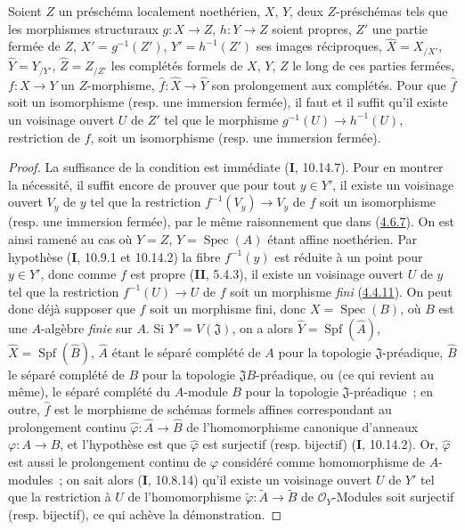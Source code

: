 \begin{proposition}[4.6.8]
\label{III.4.6.8-fr}
Soient $Z$ un préschéma localement noethérien, $X$, $Y$, deux $Z$-préschémas
tels que les morphismes structuraux $g:X\to Z$, $h:Y\to Z$ soient propres,
$Z'$ une partie fermée de $Z$, $X'=g^{-1}(Z')$, $Y'=h^{-1}(Z')$ ses images
réciproques,
$\widehat X=X_{/X'}$, $\widehat Y=Y_{/Y'}$, $\widehat Z=Z_{/Z'}$
les complétés formels de $X$, $Y$, $Z$ le long de ces parties fermées,
$f:X\to Y$ un $Z$-morphisme, $\widehat f:\widehat X\to\widehat Y$ son
prolongement aux complétés. Pour que $\widehat f$ soit un isomorphisme (\textup{resp.}
une immersion fermée), il faut et il suffit qu'il existe un voisinage ouvert
$U$ de $Z'$ tel que le morphisme $g^{-1}(U)\to h^{-1}(U)$, restriction de
$f$, soit un isomorphisme (\textup{resp.} une immersion fermée).
\end{proposition}

\begin{proof}
La suffisance de la condition est immédiate (\textbf{I}, 10.14.7). Pour en montrer la
nécessité, il suffit encore de prouver que pour tout $y\in Y'$, il existe un
voisinage ouvert $V_y$ de $y$ tel que la restriction
$f^{-1}(V_y)\to V_y$ de $f$ soit un isomorphisme (resp. une immersion
fermée), par le même raisonnement que dans
(\hyperref[III.4.6.7-fr]{4.6.7}). On est ainsi ramené au cas où $Y=Z$,
$Y=\operatorname{Spec}(A)$ étant affine noethérien. Par hypothèse
(\textbf{I}, 10.9.1 et 10.14.2) la fibre $f^{-1}(y)$ est réduite à un point pour
$y\in Y'$, donc comme $f$ est propre (\textbf{II}, 5.4.3), il existe un voisinage
ouvert $U$ de $y$ tel que la restriction $f^{-1}(U)\to U$ de $f$ soit un
morphisme \emph{fini} (\hyperref[III.4.4.11-fr]{4.4.11}). On peut donc déjà supposer
que $f$ soit un morphisme fini, donc $X=\operatorname{Spec}(B)$, où $B$ est
une $A$-algèbre \emph{finie} sur $A$. Si $Y'=V(\mathfrak J)$, on a alors
$\widehat Y=\operatorname{Spf}(\widehat A)$, $\widehat X=\operatorname{Spf}(\widehat B)$,
$\widehat A$ étant le séparé complété de $A$ pour la topologie
$\mathfrak J$-préadique, $\widehat B$ le séparé complété de $B$ pour la
topologie $\mathfrak JB$-préadique, ou (ce qui revient au même), le séparé
complété du $A$-module $B$ pour la topologie $\mathfrak J$-préadique~; en
outre, $\widehat f$ est le morphisme de schémas formels affines correspondant
au prolongement continu $\widehat\varphi:\widehat A\to\widehat B$ de
l'homomorphisme canonique d'anneaux $\varphi:A\to B$, et l'hypothèse est que
$\widehat\varphi$ est surjectif (resp. bijectif) (\textbf{I}, 10.14.2). Or,
$\widehat\varphi$ est aussi le prolongement continu de $\varphi$ considéré
comme homomorphisme de $A$-modules~; on sait alors (\textbf{I}, 10.8.14) qu'il existe
un voisinage ouvert $U$ de $Y'$ tel que la restriction à $U$ de
l'homomorphisme $\widetilde\varphi:\widetilde A\to\widetilde B$ de
$\mathcal O_Y$-Modules soit surjectif (resp. bijectif), ce qui achève la
démonstration.
\end{proof}

